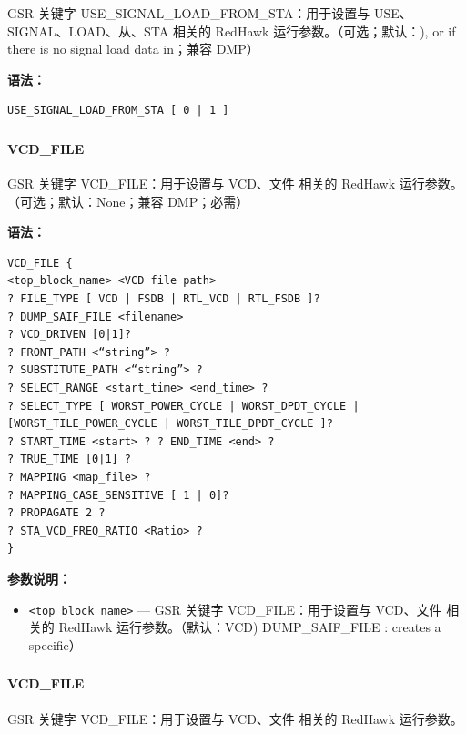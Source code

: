 GSR 关键字 USE_SIGNAL_LOAD_FROM_STA：用于设置与 USE、SIGNAL、LOAD、从、STA 相关的 RedHawk 运行参数。（可选；默认：), or if there is no signal load data in；兼容 DMP）

\textbf{语法：}
\begin{lstlisting}
USE_SIGNAL_LOAD_FROM_STA [ 0 | 1 ]
\end{lstlisting}

\subsubsection{}
\paragraph*{VCD_FILE}

GSR 关键字 VCD_FILE：用于设置与 VCD、文件 相关的 RedHawk 运行参数。（可选；默认：None；兼容 DMP；必需）

\textbf{语法：}
\begin{lstlisting}
VCD_FILE {
<top_block_name> <VCD file path>
? FILE_TYPE [ VCD | FSDB | RTL_VCD | RTL_FSDB ]?
? DUMP_SAIF_FILE <filename>
? VCD_DRIVEN [0|1]?
? FRONT_PATH <“string”> ?
? SUBSTITUTE_PATH <“string”> ?
? SELECT_RANGE <start_time> <end_time> ?
? SELECT_TYPE [ WORST_POWER_CYCLE | WORST_DPDT_CYCLE |
[WORST_TILE_POWER_CYCLE | WORST_TILE_DPDT_CYCLE ]?
? START_TIME <start> ? ? END_TIME <end> ?
? TRUE_TIME [0|1] ?
? MAPPING <map_file> ?
? MAPPING_CASE_SENSITIVE [ 1 | 0]?
? PROPAGATE 2 ?
? STA_VCD_FREQ_RATIO <Ratio> ?
}
\end{lstlisting}

\textbf{参数说明：}
\begin{itemize}
\item \texttt{<top\_block\_name>} — GSR 关键字 VCD\_FILE：用于设置与 VCD、文件 相关的 RedHawk 运行参数。（默认：VCD) DUMP\_SAIF\_FILE : creates a specifie）
\end{itemize}

\subsubsection{}
\paragraph*{VCD_FILE}

GSR 关键字 VCD_FILE：用于设置与 VCD、文件 相关的 RedHawk 运行参数。

\subsubsection{}
